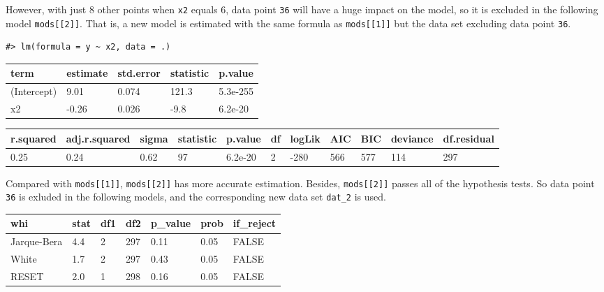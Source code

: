 \documentclass[a4paper]{article}
\begin{document}
However, with just 8 other points when \texttt{x2} equals 6, data point
\texttt{36} will have a huge impact on the model, so it is excluded in
the following model \texttt{mods{[}{[}2{]}{]}}. That is, a new model is
estimated with the same formula as \texttt{mods{[}{[}1{]}{]}} but the
data set excluding data point \texttt{36}.

\begin{verbatim}
#> lm(formula = y ~ x2, data = .)
\end{verbatim}

\begin{table}[H]
\centering
\begin{tabular}{lllll}
\toprule
term & estimate & std.error & statistic & p.value\\
\midrule
(Intercept) & 9.01 & 0.074 & 121.3 & 5.3e-255\\
x2 & -0.26 & 0.026 & -9.8 & 6.2e-20\\
\bottomrule
\end{tabular}
\end{table}

\begin{table}[H]
\centering
\begin{tabular}{lllllllllll}
\toprule
r.squared & adj.r.squared & sigma & statistic & p.value & df & logLik & AIC & BIC & deviance & df.residual\\
\midrule
0.25 & 0.24 & 0.62 & 97 & 6.2e-20 & 2 & -280 & 566 & 577 & 114 & 297\\
\bottomrule
\end{tabular}
\end{table}

Compared with \texttt{mods{[}{[}1{]}{]}}, \texttt{mods{[}{[}2{]}{]}} has
more accurate estimation. Besides, \texttt{mods{[}{[}2{]}{]}} passes all
of the hypothesis tests. So data point \texttt{36} is exluded in the
following models, and the corresponding new data set \texttt{dat\_2} is
used.

\begin{table}[H]
\centering
\begin{tabular}{lllllll}
\toprule
whi & stat & df1 & df2 & p\_value & prob & if\_reject\\
\midrule
Jarque-Bera & 4.4 & 2 & 297 & 0.11 & 0.05 & FALSE\\
White & 1.7 & 2 & 297 & 0.43 & 0.05 & FALSE\\
RESET & 2.0 & 1 & 298 & 0.16 & 0.05 & FALSE\\
\bottomrule
\end{tabular}
\end{table}
\end{document}
